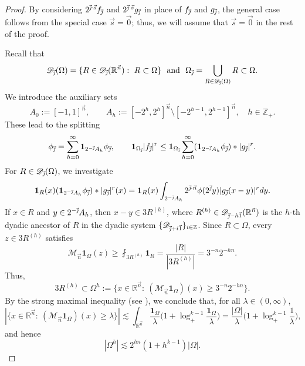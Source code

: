 \documentclass[11pt, reqno]{amsart}
\theoremstyle{definition}
\theoremstyle{remark}
\numberwithin{equation}{section}
\newcommand{\D}{\mathscr D}
\newcommand{\R}{\mathbb R}
\newcommand{\Z}{\mathbb Z}
\newcommand{\vnull}{\vec 0}
\newcommand{\vone}{\vec 1}
\newcommand{\vj}{\vec{\textit{\j}}}
\newcommand{\vn}{\vec n}
\newcommand{\vs}{\vec s}
\newcommand{\one}{\mathbf{1}}
\newcommand{\abs}[1]{|#1|}
\begin{document}
\begin{proof}
By considering $2^{\vj\cdot\vs}f_{\vj}$ and $2^{\vj\cdot\vs}g_{\vj}$ in place of $f_{\vj}$ and $g_{\vj}$, the general case follows from the special case $\vs=\vnull$; thus, we will assume that $\vs=\vnull$ in the rest of the proof.

Recall that
\begin{equation*}
\D_{\vj}(\Omega)=\{R\in\D_{\vj}(\R^{\vn}):\ R\subset\Omega\}
\ \ \text{and}\ \
\Omega_{\vj}=\bigcup_{R\in\D_{\vj}(\Omega)} R\subset\Omega.
\end{equation*}
We introduce the auxiliary sets
\begin{equation*}
A_0:=[-1,1]^{\vn},\qquad A_h:=[-2^h,2^h]^{\vn}\setminus[-2^{h-1},2^{h-1}]^{\vn},\quad h\in\Z_+.
\end{equation*}
These lead to the splitting
\begin{equation*}
\phi_{\vj}=\sum_{h=0}^\infty\one_{2^{-\vj}A_h}\phi_{\vj},\qquad
\one_{\Omega_{\vj}}\abs{f_{\vj}}^r\leq \one_{\Omega_{\vj}}\sum_{h=0}^\infty (\one_{2^{-\vj}A_h}\phi_{\vj})*\abs{g_{\vj}}^r.
\end{equation*}
For $R\in\D_{\vj}(\Omega)$, we investigate
\begin{equation*}
\one_R(x)(\one_{2^{-\vj}A_h}\phi_{\vj})*\abs{g_{\vj}}^r(x)
=\one_R(x)\int_{2^{-\vj}A_h}2^{\vj\cdot\vn}\phi(2^{\vj}y)\abs{g_{\vj}(x-y)}^r dy.
\end{equation*}
If $x\in R$ and $y\in 2^{-\vj}A_h$, then $x-y\in 3 R^{(h)}$, where $R^{(h)}\in\D_{\vj-h\vone}(\R^{\vn})$ is the $h$-th dyadic ancestor of $R$ in the dyadic system $\{\D_{\vj+i\vone}\}_{i\in\Z}$.
Since $R\subset\Omega$, every $z\in 3 R^{(h)}$ satisfies
\begin{equation*}
\mathcal M_{\vn}\one_{\Omega}(z)
\geq\fint_{3 R^{(h)}}\one_R
=\frac{\abs{R}}{\abs{3 R^{(h)}}}
=3^{-n}2^{-hn}.
\end{equation*}
Thus,
\begin{equation*}
3 R^{(h)}
\subset\Omega^h
:=\{x\in\mathbb R^{\vn}:\
(\mathcal M_{\vn}\one_{\Omega})(x)\geq 3^{-n}2^{-hn}\}.
\end{equation*}
By the strong maximal inequality (see \cite{CF75}),
we conclude that, for all $\lambda \in(0,\infty)$,
\begin{equation*}
|\{x\in\mathbb R^{\vn}:\
(\mathcal M_{\vn}\one_{\Omega})(x)\geq \lambda\}|
\lesssim\int_{\R^{\vn}}\frac{\one_\Omega}{\lambda}
\bigg( 1+\log_+^{k-1}\frac{\one_\Omega}{\lambda} \bigg)
=\frac{\abs{\Omega}}{\lambda}
\bigg( 1+\log_+^{k-1}\frac{1}{\lambda} \bigg),
\end{equation*}
and hence
\begin{equation}\label{Oh bd}
\abs{\Omega^h}\lesssim 2^{hn}(1+h^{k-1})\abs{\Omega}.
\end{equation}


\end{proof}
\end{document}
